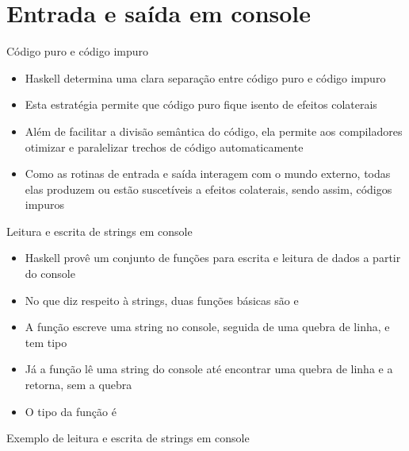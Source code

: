 \section{Entrada e saída em console}

\begin{frame}[fragile]{Código puro e código impuro}

    \begin{itemize}
        \item Haskell determina uma clara separação entre código puro e código impuro

        \item Esta estratégia permite que código puro fique isento de efeitos colaterais

        \item Além de facilitar a divisão semântica do código, ela permite aos compiladores
            otimizar e paralelizar trechos de código automaticamente

        \item Como as rotinas de entrada e saída interagem com o mundo externo, todas elas
            produzem ou estão suscetíveis a efeitos colaterais, sendo assim, códigos impuros
    \end{itemize}

\end{frame}

\begin{frame}[fragile]{Leitura e escrita de strings em console}

    \begin{itemize}
        \item Haskell provê um conjunto de funções para escrita e leitura de dados a partir 
            do console

        \item No que diz respeito à strings, duas funções básicas são 
            e 

        \item A função  escreve uma string no console, seguida de uma
            quebra de linha, e tem tipo


        \item Já a função  lê uma string do console até encontrar uma 
            quebra de linha e a retorna, sem a quebra

        \item O tipo da função  é

    \end{itemize}

\end{frame}

\begin{frame}[fragile]{Exemplo de leitura e escrita de strings em console}
\end{frame}
